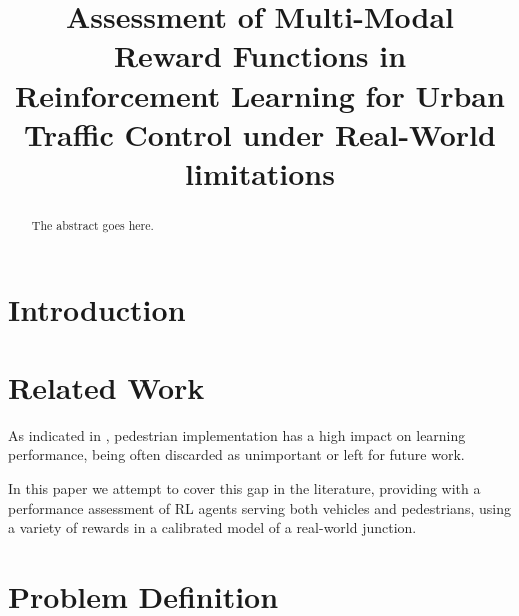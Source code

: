 \documentclass[conference]{IEEEtran}
\begin{document}
\title{Assessment of Multi-Modal Reward Functions in Reinforcement Learning for Urban Traffic Control under Real-World limitations}


\author{
\and
{}
}


\maketitle

\begin{abstract}
The abstract goes here.
\end{abstract}



\IEEEpeerreviewmaketitle



\section{Introduction}

\section{Related Work}

As indicated in \cite{survey2020}, pedestrian implementation has a high impact on learning performance, being often discarded as unimportant or left for future work.

In this paper we attempt to cover this gap in the literature, providing with a performance assessment of RL agents serving both vehicles and pedestrians, using a variety of rewards in a calibrated model of a real-world junction.
\section{Problem Definition}
\end{document}
